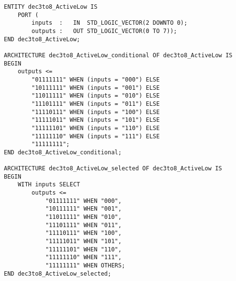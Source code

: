 \begin{enumerate}
\begin{minipage}{1\linewidth}
\begin{lstlisting}
ENTITY dec3to8_ActiveLow IS
	PORT (
		inputs	:	IN	STD_LOGIC_VECTOR(2 DOWNTO 0);
		outputs	:	OUT	STD_LOGIC_VECTOR(0 TO 7));
END dec3to8_ActiveLow;

ARCHITECTURE dec3to8_ActiveLow_conditional OF dec3to8_ActiveLow IS
BEGIN
	outputs <=
		"01111111" WHEN (inputs = "000") ELSE
		"10111111" WHEN (inputs = "001") ELSE
		"11011111" WHEN (inputs = "010") ELSE
		"11101111" WHEN (inputs = "011") ELSE
		"11110111" WHEN (inputs = "100") ELSE
		"11111011" WHEN (inputs = "101") ELSE
		"11111101" WHEN (inputs = "110") ELSE
		"11111110" WHEN (inputs = "111") ELSE
		"11111111";
END dec3to8_ActiveLow_conditional;

ARCHITECTURE dec3to8_ActiveLow_selected OF dec3to8_ActiveLow IS
BEGIN
	WITH inputs SELECT
		outputs <=
			"01111111" WHEN "000",
			"10111111" WHEN "001",
			"11011111" WHEN "010",
			"11101111" WHEN "011",
			"11110111" WHEN "100",
			"11111011" WHEN "101",
			"11111101" WHEN "110",
			"11111110" WHEN "111",
			"11111111" WHEN OTHERS;
END dec3to8_ActiveLow_selected;
		\end{lstlisting}
	\end{minipage}

\end{enumerate}
\resumetocwriting
